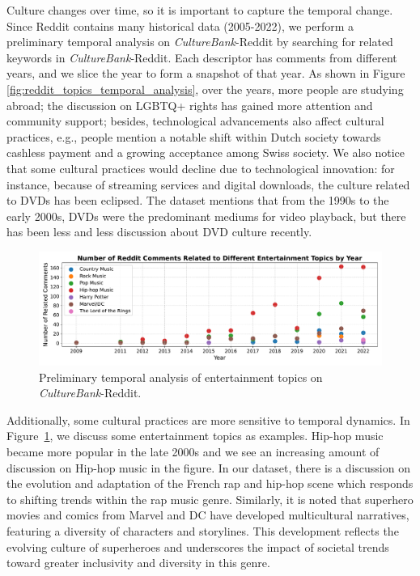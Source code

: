 \documentclass{article} %
\newcommand{\dataname}{\textit{CultureBank}\xspace}
\begin{document}
 Culture changes over time, so it is important to capture the temporal change. Since Reddit contains many  historical data (2005-2022), we perform a preliminary temporal analysis on \dataname-Reddit by searching for related keywords in \dataname-Reddit. Each descriptor has comments from different years, and we slice the year to form a snapshot of that year. As shown in Figure \ref{fig:reddit_topics_temporal_analysis}, over the years, more people are studying abroad; the discussion on LGBTQ+ rights has gained more attention and community support; %
besides, technological advancements also affect cultural practices, e.g., %
people mention a notable shift within Dutch society towards cashless payment and a growing acceptance among Swiss society. 
We also notice that some cultural practices would decline due to technological innovation: for instance, because of streaming services and digital downloads, the culture related to DVDs has been eclipsed. The dataset mentions that from the 1990s to the early 2000s, DVDs were the predominant mediums for video playback, but there has been less and less discussion about DVD culture recently.





\begin{figure}[ht]
\centering
\includegraphics[width=\textwidth]{./img/reddit_entertainment_temporal_analysis.pdf}
\caption{Preliminary temporal analysis of entertainment topics on \dataname-Reddit.}
\label{fig:reddit_entertainment_temporal_analysis}
\end{figure}


Additionally, some cultural practices are more sensitive to temporal dynamics. In Figure~\ref{fig:reddit_entertainment_temporal_analysis}, we discuss some entertainment topics as examples. Hip-hop music became more popular in the late 2000s and we see an increasing amount of discussion on Hip-hop music in the figure. In our dataset, there is a discussion on the evolution and adaptation of the French rap and hip-hop scene which responds to shifting trends within the rap music genre. Similarly, it is noted that superhero movies and comics from Marvel and DC have developed multicultural narratives, featuring a diversity of characters and storylines. This development reflects the evolving culture of superheroes and underscores the impact of societal trends toward greater inclusivity and diversity in this genre.
\end{document}
